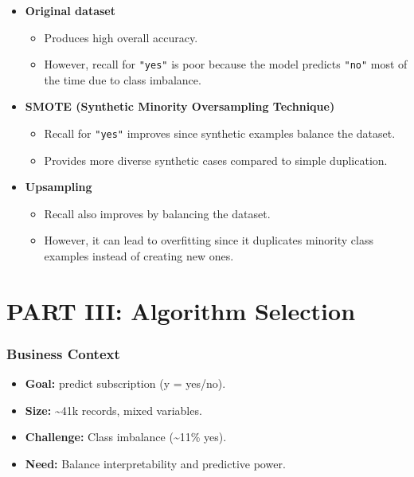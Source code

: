 \documentclass[
]{article}
\providecommand{\tightlist}{%
  \setlength{\itemsep}{0pt}\setlength{\parskip}{0pt}}
\begin{document}
\begin{itemize}
\tightlist
\item
  \textbf{Original dataset}

  \begin{itemize}
  \tightlist
  \item
    Produces high overall accuracy.\\
  \item
    However, recall for \texttt{"yes"} is poor because the model
    predicts \texttt{"no"} most of the time due to class imbalance.
  \end{itemize}
\item
  \textbf{SMOTE (Synthetic Minority Oversampling Technique)}

  \begin{itemize}
  \tightlist
  \item
    Recall for \texttt{"yes"} improves since synthetic examples balance
    the dataset.\\
  \item
    Provides more diverse synthetic cases compared to simple
    duplication.
  \end{itemize}
\item
  \textbf{Upsampling}

  \begin{itemize}
  \tightlist
  \item
    Recall also improves by balancing the dataset.\\
  \item
    However, it can lead to overfitting since it duplicates minority
    class examples instead of creating new ones.
  \end{itemize}
\end{itemize}

\section{PART III: Algorithm
Selection}\label{part-iii-algorithm-selection}

\subsubsection{Business Context}\label{business-context}

\begin{itemize}
\tightlist
\item
  \textbf{Goal:} predict subscription (y = yes/no).\\
\item
  \textbf{Size:} \textasciitilde41k records, mixed variables.\\
\item
  \textbf{Challenge:} Class imbalance (\textasciitilde11\% yes).\\
\item
  \textbf{Need:} Balance interpretability and predictive power.
\end{itemize}
\end{document}

